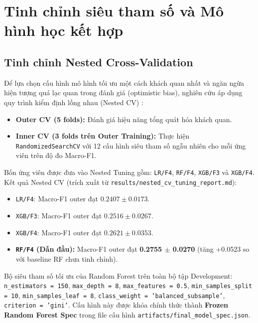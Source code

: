 \FloatBarrier
\section{Tinh chỉnh siêu tham số và Mô hình học kết hợp}
\label{sec:tuning-va-ensemble}

\subsection{Tinh chỉnh Nested Cross-Validation}
Để lựa chọn cấu hình mô hình tối ưu một cách khách quan nhất và ngăn ngừa hiện tượng quá lạc quan trong đánh giá (optimistic bias), nghiên cứu áp dụng quy trình kiểm định lồng nhau (Nested CV) \cite{varma2006bias}:
\begin{itemize}
    \item \textbf{Outer CV (5 folds):} Đánh giá hiệu năng tổng quát hóa khách quan.
    \item \textbf{Inner CV (3 folds trên Outer Training):} Thực hiện \texttt{RandomizedSearchCV} với 12 cấu hình siêu tham số ngẫu nhiên cho mỗi ứng viên trên độ đo Macro-F1.
\end{itemize}

Bốn ứng viên được đưa vào Nested Tuning gồm: \texttt{LR/F4}, \texttt{RF/F4}, \texttt{XGB/F3} và \texttt{XGB/F4}. Kết quả Nested CV (trích xuất từ \texttt{results/nested\_cv\_tuning\_report.md}):
\begin{itemize}
    \item \texttt{LR/F4}: Macro-F1 outer đạt $0.2407 \pm 0.0173$.
    \item \texttt{XGB/F3}: Macro-F1 outer đạt $0.2516 \pm 0.0267$.
    \item \texttt{XGB/F4}: Macro-F1 outer đạt $0.2621 \pm 0.0353$.
    \item \textbf{\texttt{RF/F4} (Dẫn đầu):} Macro-F1 outer đạt \textbf{0.2755 $\pm$ 0.0270} (tăng +0.0523 so với baseline RF chưa tinh chỉnh).
\end{itemize}

Bộ siêu tham số tối ưu của Random Forest trên toàn bộ tập Development: \texttt{n\_estimators = 150}, \texttt{max\_depth = 8}, \texttt{max\_features = 0.5}, \texttt{min\_samples\_split = 10}, \texttt{min\_samples\_leaf = 8}, \texttt{class\_weight = 'balanced\_subsample'}, \texttt{criterion = 'gini'}. Cấu hình này được khóa chính thức thành \textbf{Frozen Random Forest Spec} trong file cấu hình \texttt{artifacts/final\_model\_spec.json}.

